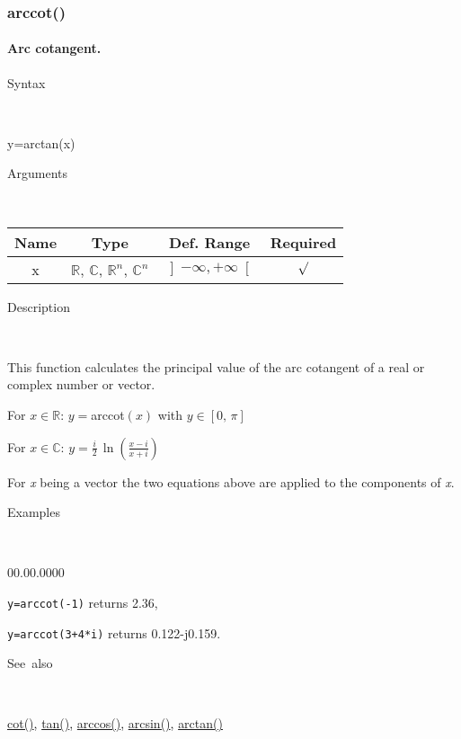 \newpage
\subsubsection*{\hypertarget{arccot}{}{\Large arccot()}}


\paragraph{\label{par:Arc-cotangent}Arc cotangent.}

\begin{description}
\item [Syntax]~
\end{description}
y=arctan(x)

\begin{description}
\item [Arguments]~
\end{description}
\begin{tabular}{|c|c|c|c|}
\hline 
Name&
Type&
Def. Range&
Required\tabularnewline
\hline
\hline 
x&
$\mathbb{R}$, $\mathbb{C}$, $\mathbb{R}^{n}$, $\mathbb{C}^{n}$&
$\left]-\infty,+\infty\right[$&
$\surd$\tabularnewline
\hline
\end{tabular}

\begin{description}
\item [Description]~
\end{description}
This function calculates the principal value of the arc cotangent
of a real or complex number or vector.

\medskip{}
For $x\in\mathbb{R}$: $y=$arccot$\left(x\right)$ with $y\in\left[0,\,\pi\right]$

\medskip{}
For $x\in\mathbb{C}$: $y=$${\displaystyle \frac{i}{2}\,\ln\left(\frac{x-i}{x+i}\right)}$
\medskip{}

For \textit{x} being a vector the two equations above are
applied to the components of \textit{x}.

\begin{description}
\item [Examples]~
\end{description}
\begin{lyxlist}{00.00.0000}
\item [\texttt{y=arccot(-1)}]returns 2.36,
\item [\texttt{y=arccot(3+4{*}i)}]returns 0.122-j0.159.
\end{lyxlist}
\begin{description}
\item [See~also]~
\end{description}
\textcolor{blue}{\hyperlink{cot}{cot()}}\textcolor{black}{,} \textcolor{blue}{\hyperlink{tan}{tan()}}\textcolor{black}{,}
\textcolor{blue}{\hyperlink{arccos}{arccos()}}\textcolor{black}{,}
\textcolor{blue}{\hyperlink{arcsin}{arcsin()}}\textcolor{black}{,}
\textcolor{blue}{\hyperlink{arctan}{arctan()}}


